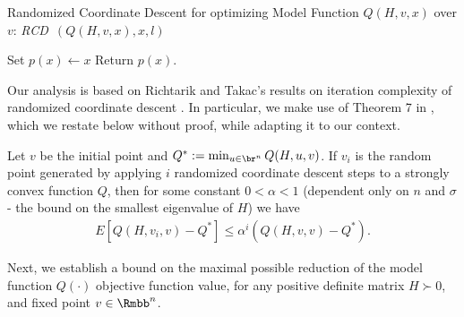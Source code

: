 \documentclass[11pt]{article}
\numberwithin{equation}{section}
\begin{document}
\begin{algorithm2e}\caption{Randomized Coordinate Descent for optimizing Model Function $Q(H, v, x)$ over $v$: {\em RCD\ }$(Q(H, v, x), x, l)$ }
    \label{alg:randomized_cd}%
Set $p(x) \gets x $\; 
Return $p(x)$.
\end{algorithm2e}








Our analysis is based on Richtarik and Takac's results on iteration complexity of randomized coordinate descent  \cite{Richtarik2012}. In particular, we make use of Theorem 7 in \cite{Richtarik2012}, which we restate below without proof, while adapting it to our context.

\begin{lemma}\label{lem:randomized_CD}

Let $v$ be the initial point and $Q^* := \min_{u\in\br^n} Q(H, u,v)$. If $v_i$ is the random point generated by applying $i$ randomized coordinate descent steps to a strongly convex function $Q$, then for some constant $0 < \alpha < 1$ (dependent only on $n$ and $\sigma$ - the bound on the smallest eigenvalue of $H$) we have
\begin{align}
    E[Q(H,v_i,v) - Q^*] \leq  \alpha^i (Q(H,v,v) - Q^*).
\end{align}
\end{lemma}

Next, we establish a bound on the maximal possible reduction of the model function $Q(\cdot)$ objective function value, for any positive definite matrix $H \succ 0$,  and fixed point $v \in \Rmbb^n$. 
\end{document}
